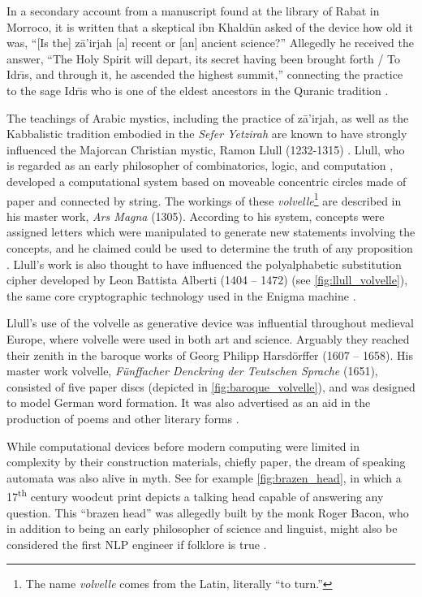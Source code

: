 In a secondary account from a manuscript found at the library of Rabat in
Morroco, it is written that a skeptical ibn Khald\={u}n asked of the device
how old it was, ``[Is the] z\={a}'irjah [a] recent or [an] ancient science?''
Allegedly he received the answer, ``The  Holy  Spirit  will  depart,  its
secret having been brought forth / To Idr\={\i}s, and through it, he ascended
the highest summit,'' connecting the practice to the sage Idr\={\i}s who is
one of the eldest ancestors in the Quranic tradition
\citep{rosenthal1958muqaddimah,link2010variantology}.
  
The teachings of Arabic mystics, including the practice of z\={a}'irjah, as
well as the Kabbalistic tradition embodied in the \textit{Sefer Yetzirah} are
known to have strongly influenced the Majorcan Christian mystic, Ramon Llull
(1232-1315) \citep{kahn1980,link2010variantology,sepllull}.  Llull, who is
regarded as an early philosopher of combinatorics, logic, and computation
\citep{bonner2007art,knuth2013art,sepllull}, developed a computational system
based on moveable concentric circles made of paper and connected by string.
The workings of these \textit{volvelle}\footnote{The name \textit{volvelle}
comes from the Latin, literally ``to turn.''} are described in his master
work, \textit{Ars Magna} (1305). According to his system, concepts were
assigned letters which were manipulated to generate new statements involving
the concepts, and  he claimed could be used to determine the truth of any
proposition \citep{Crupi2019VolvellesOK}. Llull's work is also thought to have
influenced the polyalphabetic substitution cipher developed by Leon Battista
Alberti (1404 -- 1472) (see \autoref{fig:llull_volvelle}), the same core
cryptographic technology used in the Enigma machine  \citep{kahn1980}.



 
 
Llull's use of the volvelle as generative device was influential throughout
medieval Europe, where volvelle were used in both art and science. Arguably
they reached their zenith in the baroque works of Georg Philipp
Harsd{\"o}rffer (1607 -- 1658). His master work volvelle,
\textit{F{\"u}nffacher Denckring der Teutschen Sprache} (1651), consisted of
five paper discs (depicted in \autoref{fig:baroque_volvelle}), and was
designed to model German word formation. It was also advertised as an aid in
the production of poems and other literary  forms \citep{schafer2006literary}.
  
While computational devices before modern computing were limited in complexity
by their construction materials, chiefly paper, the dream of speaking automata
was also alive in myth.  See for example \autoref{fig:brazen_head}, in which a
17\textsuperscript{th} century woodcut print depicts a talking head capable of
answering any question. This ``brazen head'' was allegedly built by the monk
Roger Bacon, who in addition to being an early philosopher of science and
linguist, might also be considered the first NLP engineer if folklore is true
\citep{hyman2016automaton,sep-roger-bacon}.

 
